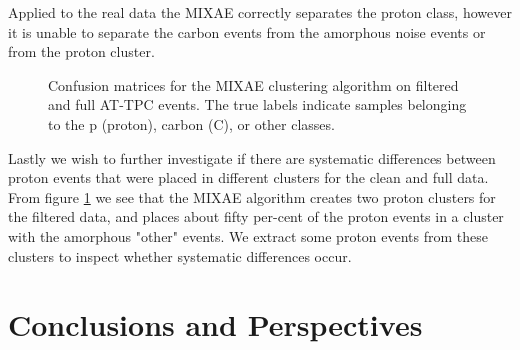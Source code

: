\documentclass[review,number,sort&compress]{elsarticle}
\begin{document}
Applied to the real data the MIXAE correctly separates the proton class, however it is unable to separate the carbon events from the amorphous noise events or from the proton cluster. 

\begin{figure}[H]
\centering

	\hspace{-1cm}
\caption[MIXAE - confusion matrices]{Confusion matrices for the MIXAE clustering algorithm on filtered and full AT-TPC events. The true labels indicate samples belonging to the p (proton), carbon (C), or other classes. }\label{fig:mixae_confmat}
\end{figure}

Lastly we wish to further investigate if there are systematic differences between proton events that were placed in different clusters for the clean and full data. From figure \ref{fig:mixae_confmat} we see that the MIXAE algorithm creates two proton clusters for the filtered data, and places about fifty per-cent of the proton events in a cluster with the amorphous "other" events. We extract some proton events from these clusters to inspect whether systematic differences occur. 


\section{Conclusions and Perspectives}\label{sec{conclusion}}
\end{document}
